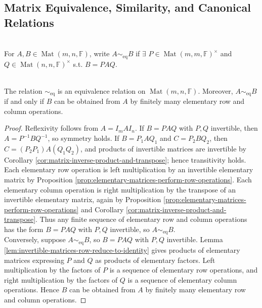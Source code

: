 \subsection{Matrix Equivalence, Similarity, and Canonical Relations}
\begin{definition} \label{def:matrix-equivalence} \\
For $A,B\in\operatorname{Mat}(m,n,\mathbb{F})$, write $A\sim_{\mathrm{eq}} B$ if $\exists$ $P\in\operatorname{Mat}(m,m,\mathbb{F})^{\times}$ and $Q\in\operatorname{Mat}(n,n,\mathbb{F})^{\times}$ s.t. $B=PAQ$.
\end{definition}

\begin{proposition} \label{prop:matrix-equivalence-basic-properties} \\
The relation $\sim_{\mathrm{eq}}$ is an equivalence relation on $\operatorname{Mat}(m,n,\mathbb{F})$. Moreover, $A\sim_{\mathrm{eq}}B$ if and only if $B$ can be obtained from $A$ by finitely many elementary row and column operations.
\begin{proof}
Reflexivity follows from $A=I_mAI_n$. If $B=PAQ$ with $P,Q$ invertible, then $A=P^{-1}BQ^{-1}$, so symmetry holds. If $B=P_1AQ_1$ and $C=P_2BQ_2$, then $C=(P_2P_1)A(Q_1Q_2)$, and products of invertible matrices are invertible by Corollary \ref{cor:matrix-inverse-product-and-transpose}; hence transitivity holds.\\
Each elementary row operation is left multiplication by an invertible elementary matrix by Proposition \ref{prop:elementary-matrices-perform-row-operations}. Each elementary column operation is right multiplication by the transpose of an invertible elementary matrix, again by Proposition \ref{prop:elementary-matrices-perform-row-operations} and Corollary \ref{cor:matrix-inverse-product-and-transpose}. Thus any finite sequence of elementary row and column operations has the form $B=PAQ$ with $P,Q$ invertible, so $A\sim_{\mathrm{eq}}B$.\\
Conversely, suppose $A\sim_{\mathrm{eq}}B$, so $B=PAQ$ with $P,Q$ invertible. Lemma \ref{lem:invertible-matrices-row-reduce-to-identity} gives products of elementary matrices expressing $P$ and $Q$ as products of elementary factors. Left multiplication by the factors of $P$ is a sequence of elementary row operations, and right multiplication by the factors of $Q$ is a sequence of elementary column operations. Hence $B$ can be obtained from $A$ by finitely many elementary row and column operations.
\end{proof}
\end{proposition}

